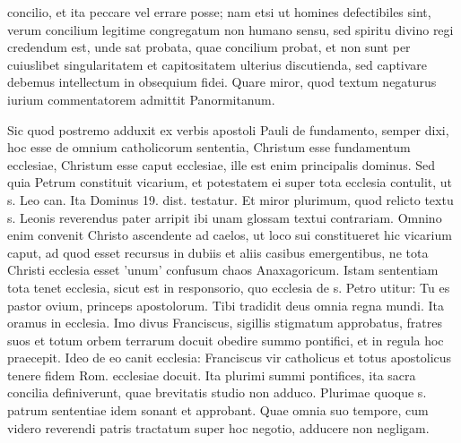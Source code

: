 concilio, et ita peccare vel errare posse; nam etsi ut homines defectibiles sint, verum concilium legitime congregatum non humano sensu, sed spiritu divino regi credendum est, unde sat probata, quae concilium probat, et non sunt per cuiuslibet singularitatem et capitositatem ulterius discutienda, sed captivare debemus intellectum in obsequium fidei. Quare miror, quod textum negaturus iurium commentatorem admittit Panormitanum.

Sic quod postremo adduxit ex verbis apostoli Pauli de fundamento, semper dixi, hoc esse de omnium catholicorum sententia, Christum esse fundamentum ecclesiae, Christum esse caput ecclesiae, ille est enim principalis dominus. Sed quia Petrum constituit vicarium, et potestatem ei super tota ecclesia contulit, ut s. Leo can. Ita Dominus 19. dist. testatur. Et miror plurimum, quod relicto textu s. Leonis reverendus pater arripit ibi unam glossam textui contrariam. Omnino enim convenit Christo ascendente ad caelos, ut loco sui constitueret hic vicarium caput, ad quod esset recursus in dubiis et aliis casibus emergentibus, ne tota Christi ecclesia esset 'unum' confusum chaos Anaxagoricum. Istam sententiam tota tenet ecclesia, sicut est in responsorio, quo ecclesia de s. Petro utitur: Tu es pastor ovium, princeps apostolorum. Tibi tradidit deus omnia regna mundi. Ita oramus in ecclesia. Imo divus Franciscus, sigillis stigmatum approbatus, fratres suos et totum orbem terrarum docuit obedire summo pontifici, et in regula hoc praecepit. Ideo de eo canit ecclesia: Franciscus vir catholicus et totus apostolicus tenere fidem Rom. ecclesiae docuit. Ita plurimi summi pontifices, ita sacra concilia definiverunt, quae brevitatis studio non adduco. Plurimae quoque s. patrum sententiae idem sonant et approbant. Quae omnia suo tempore, cum videro reverendi patris tractatum super hoc negotio, adducere non negligam.

